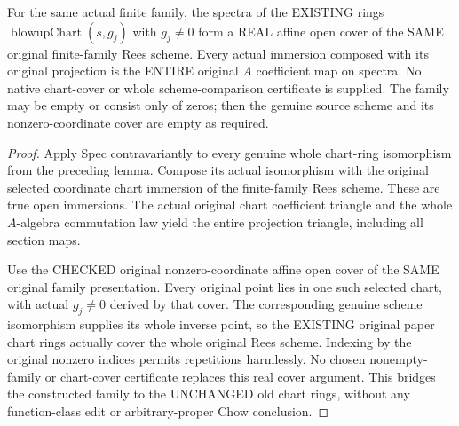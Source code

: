 \begin{theorem}
\label{paper:actual-finite-family-original-affine-cover}
For the same actual finite family, the spectra of the EXISTING rings
$\operatorname{blowupChart}(s,g_j)$ with $g_j\ne0$ form a REAL affine open cover
of the SAME original finite-family Rees scheme. Every actual immersion composed
with its original projection is the ENTIRE original $A$ coefficient map on
spectra. No native chart-cover or whole scheme-comparison certificate is supplied.
The family may be empty or consist only of zeros; then the genuine source
scheme and its nonzero-coordinate cover are empty as required.
\leanok
\end{theorem}
\begin{proof}
Apply Spec contravariantly to every genuine whole chart-ring isomorphism from
the preceding lemma. Compose its actual isomorphism with the original selected
coordinate chart immersion of the finite-family Rees scheme. These are true
open immersions. The actual original chart coefficient triangle and the whole
$A$-algebra commutation law yield the entire projection triangle, including
all section maps.

Use the CHECKED original nonzero-coordinate affine open cover of the SAME
original family presentation. Every original point lies in one such selected
chart, with actual $g_j\ne0$ derived by that cover. The corresponding genuine
scheme isomorphism supplies its whole inverse point, so the EXISTING original
paper chart rings actually cover the whole original Rees scheme. Indexing by
the original nonzero indices permits repetitions harmlessly. No chosen nonempty-family or chart-cover certificate replaces this real cover argument.
This bridges the constructed family to the UNCHANGED old chart rings, without
any function-class edit or arbitrary-proper Chow conclusion.
\end{proof}
